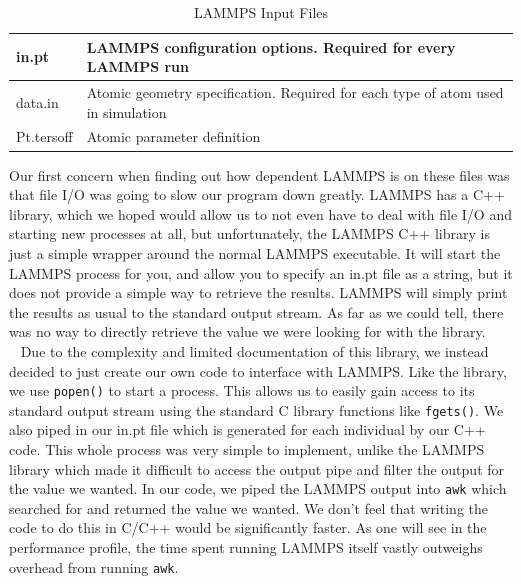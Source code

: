 \documentclass[letterpaper, 12pt]{article}
\begin{document}
\begin{flushleft}
\begin{table}[ht]
	\centering
	\caption{LAMMPS Input Files}
	\label{lammpsinput}
	\begin{tabular}{|l|l|}
		\hline
		in.pt & LAMMPS configuration options. Required for every LAMMPS run \\ \hline
		data.in & Atomic geometry specification. Required for each type of atom used in simulation \\ \hline
		Pt.tersoff & Atomic parameter definition \\ \hline
	\end{tabular}
\end{table}

Our first concern when finding out how dependent LAMMPS is on these files was that file I/O was going to slow our program down greatly. LAMMPS has a C++ library, which we hoped would allow us to not even have to deal with file I/O and starting new processes at all, but unfortunately, the LAMMPS C++ library is just a simple wrapper around the normal LAMMPS executable. It will start the LAMMPS process for you, and allow you to specify an in.pt file as a string, but it does not provide a simple way to retrieve the results. LAMMPS will simply print the results as usual to the standard output stream. As far as we could tell, there was no way to directly retrieve the value we were looking for with the library.\\
~\newline
Due to the complexity and limited documentation of this library, we instead decided to just create our own code to interface with LAMMPS. Like the library, we use \texttt{popen()} to start a process. This allows us to easily gain access to its standard output stream using the standard C library functions like \texttt{fgets()}. We also piped in our in.pt file which is generated for each individual by our C++ code. This whole process was very simple to implement, unlike the LAMMPS library which made it difficult to access the output pipe and filter the output for the value we wanted. In our code, we piped the LAMMPS output into \texttt{awk} which searched for and returned the value we wanted. We don't feel that writing the code to do this in C/C++ would be significantly faster. As one will see in the performance profile, the time spent running LAMMPS itself vastly outweighs overhead from running \texttt{awk}.  \\
~\newline

\end{flushleft}
\end{document}

